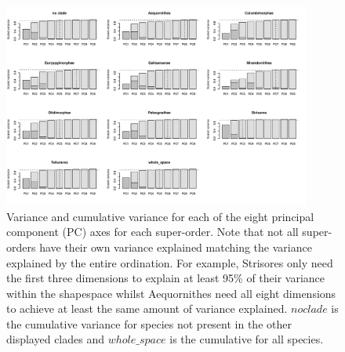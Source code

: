 \documentclass[12pt,a4paper]{article}
\begin{document}
\begin{figure}[H]
\centering
   \includegraphics[width=0.9\textwidth]{Figures/axis_selection.pdf}
\caption{Variance and cumulative variance for each of the eight principal component (PC) axes for each super-order. Note that not all super-orders have their own variance explained matching the variance explained by the entire ordination. For example, Strisores only need the first three dimensions to explain at least 95\% of their variance within the shapespace whilst Aequornithes need all eight dimensions to achieve at least the same amount of variance explained. $no clade$ is the cumulative variance for species not present in the other displayed clades and $whole\_space$ is the cumulative for all species.}
\label{Fig:axes_variance}
\end{figure}

\newpage
\end{document}
